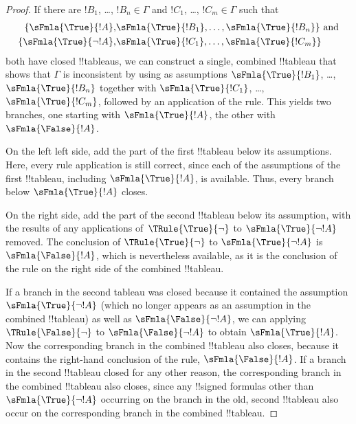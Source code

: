 \begin{proof}
  If there are $!B_1$, \dots, $!B_n \in \Gamma$ and $!C_1$, \dots,
  $!C_m \in \Gamma$ such that
  \begin{align*}
    \{\sFmla{\True}{!A}, &
    \sFmla{\True}{!B_1}, \dots, \sFmla{\True}{!B_n}\} \text{ and}\\
    \{\sFmla{\True}{\lnot !A}, &
    \sFmla{\True}{!C_1}, \dots, \sFmla{\True}{!C_m}\}
  \end{align*}
  both have closed !!{tableau}s, we can construct a single, combined
  !!{tableau} that shows that $\Gamma$ is inconsistent by using as
  assumptions $\sFmla{\True}{!B_1}$, \dots, $\sFmla{\True}{!B_n}$
  together with $\sFmla{\True}{!C_1}$, \dots, $\sFmla{\True}{!C_m}$,
  followed by an application of the \Cut{} rule. This yields two
  branches, one starting with $\sFmla{\True}{!A}$, the other with
  $\sFmla{\False}{!A}$.  
  
  On the left left side, add the part of the first
  !!{tableau} below its assumptions. Here, every rule application is still
  correct, since each of the assumptions of the first !!{tableau},
  including $\sFmla{\True}{!A}$, is available. Thus, every branch
  below $\sFmla{\True}{!A}$ closes. 
  
  On the right side, add the part of the second !!{tableau} below its
  assumption, with the results of any applications
  of~$\TRule{\True}{\lnot}$ to $\sFmla{\True}{\lnot !A}$ removed.  The
  conclusion of $\TRule{\True}{\lnot}$ to $\sFmla{\True}{\lnot !A}$ is
  $\sFmla{\False}{!A}$, which is nevertheless available, as it is the
  conclusion of the \Cut{} rule on the right side of the combined !!{tableau}.

  If a branch in the second tableau was closed because it contained
  the assumption $\sFmla{\True}{\lnot !A}$ (which no longer appears as
  an assumption in the combined !!{tableau}) as well as
  $\sFmla{\False}{\lnot !A}$, we can applying $\TRule{\False}{\lnot}$
  to $\sFmla{\False}{\lnot !A}$ to obtain $\sFmla{\True}{!A}$. Now the
  corresponding branch in the combined !!{tableau} also closes,
  because it contains the right-hand conclusion of the \Cut{} rule,
  $\sFmla{\False}{!A}$. If a branch in the second !!{tableau} closed
  for any other reason, the corresponding branch in the combined
  !!{tableau} also closes, since any !!{signed formula}s other than
  $\sFmla{\True}{\lnot !A}$ occurring on the branch in the old, second
  !!{tableau} also occur on the corresponding branch in the combined
  !!{tableau}.
  \end{proof}





